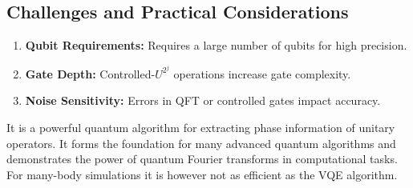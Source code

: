 \documentclass[%
oneside,                 %
final,                   %
10pt]{article}
\begin{document}
\noindent
\subsection{Challenges and Practical Considerations}

\begin{enumerate}
\item \textbf{Qubit Requirements:} Requires a large number of qubits for high precision.

\item \textbf{Gate Depth:} Controlled-$U^{2^j}$ operations increase gate complexity.

\item \textbf{Noise Sensitivity:} Errors in QFT or controlled gates impact accuracy.
\end{enumerate}

\noindent
It is a powerful quantum algorithm for extracting phase information of
unitary operators. It forms the foundation for many advanced quantum
algorithms and demonstrates the power of quantum Fourier transforms in
computational tasks. For many-body simulations it is however not as efficient as the VQE algorithm.


\end{document}

